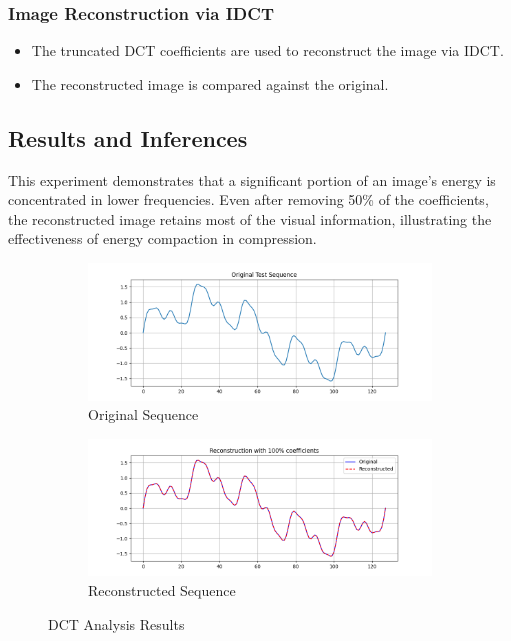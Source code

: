 \documentclass[12pt,a4paper]{article}
\begin{document}
\subsubsection{Image Reconstruction via IDCT}
\begin{itemize}
  \item The truncated DCT coefficients are used to reconstruct the image via IDCT.
  \item The reconstructed image is compared against the original.
\end{itemize}

\subsection{Results and Inferences}
This experiment demonstrates that a significant portion of an image's energy is concentrated in lower frequencies. Even after removing 50\% of the coefficients, the reconstructed image retains most of the visual information, illustrating the effectiveness of energy compaction in compression.

\begin{figure}[H]
  \centering
  \begin{subfigure}[b]{0.7\textwidth}
    \centering
    \includegraphics[width=\textwidth]{dct/original_sequence.png}
    \caption{Original Sequence}
  \end{subfigure}
  \begin{subfigure}[b]{0.7\textwidth}
    \centering
    \includegraphics[width=\textwidth]{dct/reconstruction_100percent.png}
    \caption{Reconstructed Sequence}
  \end{subfigure}
  \caption{DCT Analysis Results}
  \label{fig:dct_analysis}
\end{figure}
\end{document}
